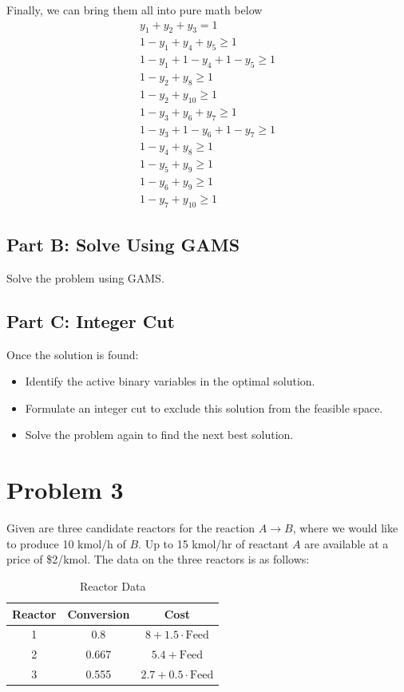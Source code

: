 \documentclass[11pt]{article}
\begin{document}
Finally, we can bring them all into pure math below
\begin{align*}
  y_1 + y_2 + y_3 = 1 \\
  1-y_1 + y_4 + y_5 \geq 1 \\
  1-y_1 + 1-y_4 + 1-y_5 \geq 1 \\
  1-y_2 + y_8 \geq 1 \\
  1-y_2 + y_{10} \geq 1 \\
  1-y_3 + y_6 + y_7 \geq 1 \\
  1-y_3 + 1 - y_6 + 1- y_7 \geq 1 \\
  1-y_4 + y_8 \geq 1 \\
  1-y_5+ y_9 \geq 1 \\
  1-y_6 + y_9 \geq 1 \\
  1-y_7 + y_{10} \geq 1
\end{align*}



\subsection{Part B: Solve Using GAMS}
Solve the problem using GAMS.

\subsection{Part C: Integer Cut}
Once the solution is found:
\begin{itemize}
  \item Identify the active binary variables in the optimal solution.
  \item Formulate an integer cut to exclude this solution from the feasible space.
  \item Solve the problem again to find the next best solution.
\end{itemize}

\clearpage
\section{Problem 3}
\label{prob3}

Given are three candidate reactors for the reaction \( A \rightarrow B \), where we would like to produce 10 kmol/h of \( B \). Up to 15 kmol/hr of reactant \( A \) are available at a price of \$2/kmol. The data on the three reactors is as follows:

\begin{table}[htbp]
\centering
\begin{tabular}{|c|c|c|}
\hline
\textbf{Reactor} & \textbf{Conversion} & \textbf{Cost} \\ \hline
1 & 0.8 & \( 8 + 1.5 \cdot \text{Feed} \) \\ \hline
2 & 0.667 & \( 5.4 + \text{Feed} \) \\ \hline
3 & 0.555 & \( 2.7 + 0.5 \cdot \text{Feed} \) \\ \hline
\end{tabular}
\caption{Reactor Data}
\label{tab:reactor_data}
\end{table}
\end{document}

